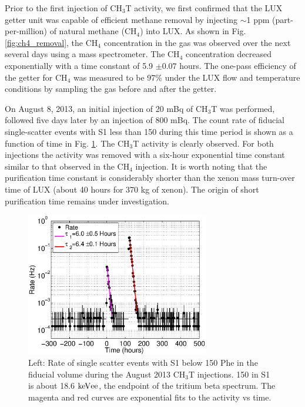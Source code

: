 Prior to the first injection of CH$_3$T activity, we first confirmed that the LUX getter unit was capable of efficient methane removal by injecting  $\sim$1 ppm (part-per-million) of natural methane (CH$_4$) into LUX. As shown in Fig. \ref{fig:ch4_removal}, the CH$_4$ concentration in the gas was observed over the next several days using a mass spectrometer. The CH$_4$ concentration decreased exponentially with a time constant of 5.9 $\pm 0.07$ hours. The one-pass efficiency of the getter for CH$_4$ was measured to be 97\% under the LUX flow and temperature conditions by sampling the gas before and after the getter. 

On August 8, 2013, an initial injection of 20 mBq of CH$_3$T was performed, followed five days later by an injection of 800 mBq. The count rate of fiducial single-scatter events with S1 less than 150  during this time period is shown as a function of time in Fig. \ref{fig:ch3t_removal}. The CH$_3$T activity is clearly observed. For both injections the activity was removed with a six-hour exponential time constant similar to that observed in the CH$_4$ injection. It is worth noting that the purification time constant is considerably shorter than the xenon mass turn-over time of LUX (about 40 hours for 370 kg of xenon).  The origin of short purification time remains under investigation.

\begin{figure}[h!]\centering
\includegraphics[width=80mm]{fig/CH3T_Rate_fid_150_Run03_Tritium_Rate.eps}
\caption{Left: Rate of single scatter events with S1 below 150 Phe in the fiducial volume during the August 2013 CH$_3$T injections. 150  in S1 is about 18.6 $\rm keV{ee}$, the endpoint of the tritium beta spectrum. The magenta and red curves are exponential fits to the activity vs time.}
\label{fig:ch3t_removal}
\end{figure}

